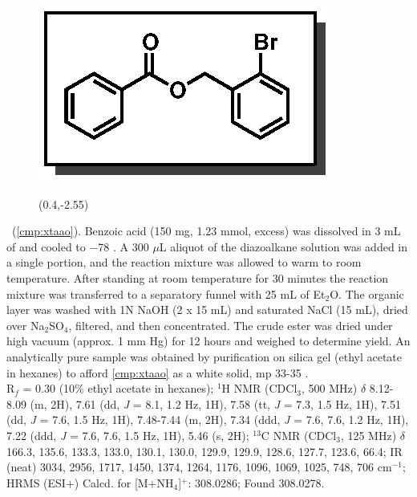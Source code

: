\pagebreak
\begin{figure}
  \vspace{-15pt}
  \begin{center}
    \includegraphics[scale=0.8]{chp_asymmetric/images/xtaao}
           \begin{textblock}{1}(0.4,-2.55)  \end{textblock}
  \end{center}
  \vspace{-35pt}
\end{figure}\noindent \textbf{\CMPxtaao}\ (\ref{cmp:xtaao}). Benzoic acid (150 mg, 1.23 mmol,
excess) was dissolved in 3 mL of  and cooled to $-$78 \degc. A 300 $\mu$L aliquot of the
diazoalkane solution was added in a single portion, and the reaction mixture was allowed to warm to room
temperature. After standing at room temperature for 30 minutes the reaction mixture was transferred
to a separatory funnel with 25 mL of Et$_2$O. The organic layer was washed with 1N NaOH (2 x 15 mL)
and saturated NaCl (15 mL), dried over Na$_2$SO$_4$, filtered, and then concentrated. The crude
ester was dried under high vacuum (approx. 1 mm Hg) for 12 hours and weighed to determine yield.
An analytically pure sample was obtained by purification on silica gel (ethyl acetate in hexanes)
to afford \ref{cmp:xtaao} as a white solid, mp 33-35 \degc. \\ 
R$_f$ = 0.30 (10\% ethyl acetate in hexanes); $^1$H NMR (CDCl$_3$, 500
MHz) $\delta$ 8.12-8.09 (m, 2H), 7.61 (dd, \textit{J} = 8.1, 1.2 Hz, 1H), 7.58 (tt, \textit{J} = 7.3, 1.5
Hz, 1H), 7.51 (dd, \textit{J} = 7.6, 1.5 Hz, 1H), 7.48-7.44 (m, 2H), 7.34 (ddd,
\textit{J} = 7.6, 7.6, 1.2 Hz, 1H), 7.22 (ddd, \textit{J} = 7.6, 7.6, 1.5 Hz,
1H), 5.46 (s, 2H); $^{13}$C NMR (CDCl$_3$, 125 MHz) $\delta$ 166.3, 135.6,
133.3, 133.0, 130.1, 130.0, 129.9, 129.9, 128.6, 127.7, 123.6, 66.4; IR (neat)
3034, 2956, 1717, 1450, 1374, 1264, 1176, 1096, 1069, 1025, 748, 706 cm$^{-1}$;
HRMS (ESI+) Calcd. for  [M+NH$_4$]$^+$: 308.0286; Found 308.0278.

